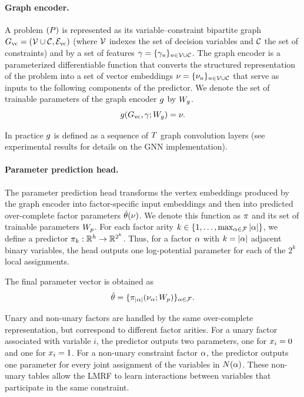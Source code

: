\paragraph{Graph encoder.} A problem $(P)$ is represented as its variable--constraint bipartite graph $G_{\mathrm{vc}}=(\mathcal{V} \cup \mathcal{C}, \mathcal{E}_{\mathrm{vc}})$ (where $\mathcal{V}$ indexes the set of decision variables and $\mathcal{C}$ the set of constraints) and by a set of features $\gamma = \{ \gamma_u \}_{u \in \mathcal{V} \cup \mathcal{C}}$. The graph encoder is a parameterized differentiable function that converts the structured representation of the problem into a set of vector embeddings $\nu = \{ \nu_u \}_{u \in \mathcal{V} \cup \mathcal{C} }$ that serve as inputs to the following components of the predictor. We denote the set of trainable parameters of the graph encoder $g$ by $W_g$.
\begin{equation}
    g (G_{\mathrm{vc}}, \gamma; W_g) = \nu.
\end{equation}

In practice $g$ is defined as a sequence of $T$ graph convolution layers (see experimental results for details on the GNN implementation). 

\paragraph{Parameter prediction head.} The parameter prediction head transforms the vertex embeddings produced by the graph encoder into factor-specific input embeddings and then into predicted over-complete factor parameters $\hat{\theta}(\nu)$. We denote this function as $\pi$ and its set of trainable parameters $W_p$. For each factor arity $k \in \{1,\ldots,\max_{\alpha\in\mathcal{F}}|\alpha|\}$, we define a predictor
$\pi_k : \mathbb{R}^{h} \rightarrow \mathbb{R}^{2^k}$. Thus, for a factor $\alpha$ with $k=|\alpha|$ adjacent binary variables, the head outputs one log-potential parameter for each of the $2^k$ local assignments.

The final parameter vector is obtained as 
\begin{equation}
    \hat{\theta} = \{\pi_{|\alpha|} (\nu_{\alpha}; W_p)\}_{\alpha\in \mathcal{F}}.
\end{equation}

Unary and non-unary factors are handled by the same over-complete representation, but correspond to different factor arities. For a unary factor associated with variable $i$, the predictor outputs two parameters, one for $x_i=0$ and one for $x_i=1$. For a non-unary constraint factor $\alpha$, the predictor outputs one parameter for every joint assignment of the variables in $N(\alpha)$. These non-unary tables allow the LMRF to learn interactions between variables that participate in the same constraint.

